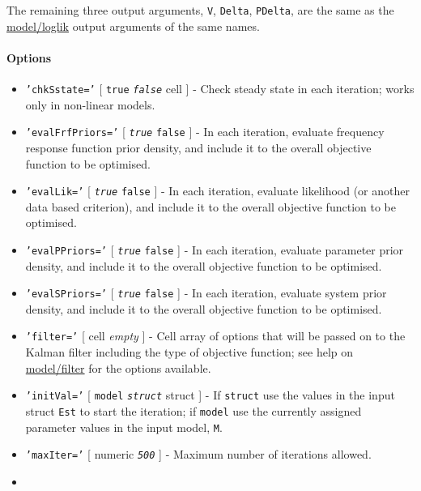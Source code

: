  The remaining three output arguments, \texttt{V}, \texttt{Delta},
 \texttt{PDelta}, are the same as the \url{model/loglik} output arguments
 of the same names.
 
 \paragraph{Options}
 
 \begin{itemize}
 \item
   \texttt{'chkSstate='} {[} \texttt{true} \textbar{}
   \emph{\texttt{false}} \textbar{} cell {]} - Check steady state in each
   iteration; works only in non-linear models.
 \item
   \texttt{'evalFrfPriors='} {[} \emph{\texttt{true}} \textbar{}
   \texttt{false} {]} - In each iteration, evaluate frequency response
   function prior density, and include it to the overall objective
   function to be optimised.
 \item
   \texttt{'evalLik='} {[} \emph{\texttt{true}} \textbar{} \texttt{false}
   {]} - In each iteration, evaluate likelihood (or another data based
   criterion), and include it to the overall objective function to be
   optimised.
 \item
   \texttt{'evalPPriors='} {[} \emph{\texttt{true}} \textbar{}
   \texttt{false} {]} - In each iteration, evaluate parameter prior
   density, and include it to the overall objective function to be
   optimised.
 \item
   \texttt{'evalSPriors='} {[} \emph{\texttt{true}} \textbar{}
   \texttt{false} {]} - In each iteration, evaluate system prior density,
   and include it to the overall objective function to be optimised.
 \item
   \texttt{'filter='} {[} cell \textbar{} \emph{empty} {]} - Cell array
   of options that will be passed on to the Kalman filter including the
   type of objective function; see help on \url{model/filter} for the
   options available.
 \item
   \texttt{'initVal='} {[} \texttt{model} \textbar{}
   \emph{\texttt{struct}} \textbar{} struct {]} - If \texttt{struct} use
   the values in the input struct \texttt{Est} to start the iteration; if
   \texttt{model} use the currently assigned parameter values in the
   input model, \texttt{M}.
 \item
   \texttt{'maxIter='} {[} numeric \textbar{} \emph{\texttt{500}} {]} -
   Maximum number of iterations allowed.
 \item

\end{itemize}
